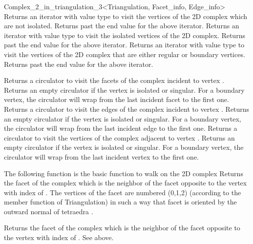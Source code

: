 \begin{ccRefClass}{Complex_2_in_triangulation_3<Triangulation, Facet_info, Edge_info>}
{Returns an iterator with value type  to visit the
vertices of the 2D complex which are not isolated.}
\ccGlue
{}
{Returns past the end value for the above iterator.}
\ccGlue
{}
{Returns an iterator with value type  to visit the isolated
vertices of the 2D complex.}
\ccGlue
{}
{Returns past the end value for the above iterator.}
\ccGlue
{}
{Returns an iterator with value type  to visit the 
vertices of the 2D complex that are either regular or boundary vertices.}
\ccGlue
{}
{Returns past the end value for the above iterator.}


{Returns a circulator to visit the facets of the complex incident to
vertex . Returns an empty circulator if the vertex is isolated or
singular. For a boundary  vertex,  the circulator will wrap from the last
incident facet  to the first one.}
\ccGlue
{}
{Returns a circulator to visit the edges of the complex incident to
vertex . Returns an empty circulator if the vertex is isolated or
singular. For a boundary  vertex,  the circulator will wrap from the last
incident edge  to the first one.}
\ccGlue
{}
{Returns a circulator to visit the vertices of the complex adjacent to
vertex . Returns an empty circulator if the vertex is isolated or
singular. For a boundary  vertex,  the circulator will wrap from the last
incident vertex  to the first one.}

The following function is the basic function to walk on the 2D
complex
{Returns the facet of the complex which is the neighbor of 
the facet  opposite to the vertex with index  of
.
The vertices of the facet  are numbered
(0,1,2) (according to the  member function
of Triangulation)
in such a way that facet  is oriented by the
outward normal of tetraedra .}


{Returns the facet of the complex which is the neighbor of 
the facet  opposite to the vertex with index  of .
See above.}


\end{ccRefClass}
